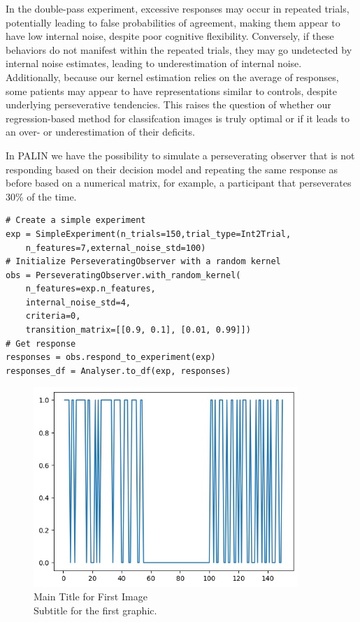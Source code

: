 In the double-pass experiment, excessive responses may occur in repeated trials, potentially leading to false probabilities of agreement, making them appear to have low internal noise, despite poor cognitive flexibility. Conversely, if these behaviors do not manifest within the repeated trials, they may go undetected by internal noise estimates, leading to underestimation of internal noise. Additionally, because our kernel estimation relies on the average of responses, some patients may appear to have representations similar to controls, despite underlying perseverative tendencies. This raises the question of whether our regression-based method for classifcation images is truly optimal or if it leads to an over- or underestimation of their deficits.


\begin{tcolorbox}[title=Palin Toolbox: Perseverating observer simulation,
    colback=white!30!white, colframe=blue!80!white]
In PALIN we have the possibility to simulate a perseverating observer that is not responding based on their decision model and repeating the same response as before based on a numerical matrix, for example, a participant that perseverates 30\% of the time. 

\tcblower

\begin{verbatim}
# Create a simple experiment
exp = SimpleExperiment(n_trials=150,trial_type=Int2Trial,
    n_features=7,external_noise_std=100)
# Initialize PerseveratingObserver with a random kernel
obs = PerseveratingObserver.with_random_kernel(
    n_features=exp.n_features,
    internal_noise_std=4,
    criteria=0,
    transition_matrix=[[0.9, 0.1], [0.01, 0.99]])
# Get response
responses = obs.respond_to_experiment(exp)
responses_df = Analyser.to_df(exp, responses)
\end{verbatim}

\end{tcolorbox}
\begin{figure}[ht!]
    \centering
    \includegraphics[width=10cm]{MainLayout/Images/perseveration.png}
    \caption{Main Title for First Image \\ \small Subtitle for the first graphic.}
    \label{fig:perseverating_observer}
\end{figure}


